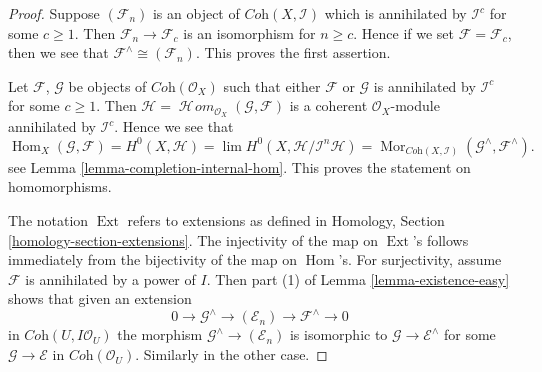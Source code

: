 \documentclass[10pt,a4paper]{amsart}
\theoremstyle{plain}
\theoremstyle{definition}
\theoremstyle{remark}
\numberwithin{equation}{subsection}
\def\lim{\mathop{\mathrm{lim}}\nolimits}
\def\Hom{\mathop{\mathrm{Hom}}\nolimits}
\def\Ext{\mathop{\mathrm{Ext}}\nolimits}
\def\SheafHom{\mathop{\mathcal{H}\!\mathit{om}}\nolimits}
\def\Mor{\mathop{\mathrm{Mor}}\nolimits}
\begin{document}
\begin{proof}
Suppose $(\mathcal{F}_n)$ is an object of $\textit{Coh}(X, \mathcal{I})$
which is annihilated by $\mathcal{I}^c$ for some $c \geq 1$. Then
$\mathcal{F}_n \to \mathcal{F}_c$ is an isomorphism for $n \geq c$.
Hence if we set $\mathcal{F} = \mathcal{F}_c$, then we see that
$\mathcal{F}^\wedge \cong (\mathcal{F}_n)$. This proves the first assertion.

\medskip\noindent
Let $\mathcal{F}$, $\mathcal{G}$ be objects of $\textit{Coh}(\mathcal{O}_X)$
such that either $\mathcal{F}$ or $\mathcal{G}$ is annihilated by
$\mathcal{I}^c$ for some $c \geq 1$. Then
$\mathcal{H} = \SheafHom_{\mathcal{O}_X}(\mathcal{G}, \mathcal{F})$
is a coherent $\mathcal{O}_X$-module annihilated by $\mathcal{I}^c$.
Hence we see that
$$
\Hom_X(\mathcal{G}, \mathcal{F}) =
H^0(X, \mathcal{H}) =
\lim H^0(X, \mathcal{H}/\mathcal{I}^n\mathcal{H}) =
\Mor_{\textit{Coh}(X, \mathcal{I})}
(\mathcal{G}^\wedge, \mathcal{F}^\wedge).
$$
see Lemma \ref{lemma-completion-internal-hom}.
This proves the statement on homomorphisms.

\medskip\noindent
The notation $\Ext$ refers to extensions as defined in
Homology, Section \ref{homology-section-extensions}.
The injectivity of the map on $\Ext$'s follows immediately
from the bijectivity of the map on $\Hom$'s.
For surjectivity, assume $\mathcal{F}$ is annihilated
by a power of $I$. Then part (1) of Lemma \ref{lemma-existence-easy}
shows that given an extension
$$
0 \to \mathcal{G}^\wedge \to (\mathcal{E}_n) \to \mathcal{F}^\wedge \to 0
$$
in $\textit{Coh}(U, I\mathcal{O}_U)$
the morphism $\mathcal{G}^\wedge \to (\mathcal{E}_n)$ is
isomorphic to $\mathcal{G} \to \mathcal{E}^\wedge$
for some $\mathcal{G} \to \mathcal{E}$ in $\textit{Coh}(\mathcal{O}_U)$.
Similarly in the other case.
\end{proof}
\end{document}

